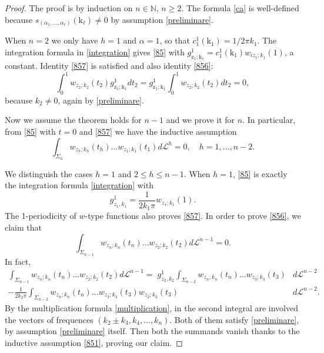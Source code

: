 \documentclass[12pt, reqno]{amsart}
\theoremstyle{plain}
\theoremstyle{definition}
\theoremstyle{remark}
\numberwithin{equation}{section}
\newcommand{\N}{\mathbb{N}}
\renewcommand{\L}{\mathcal{L}}
\newcommand{\0}{\theta}
\renewcommand{\a}{\alpha}
\renewcommand{\k}{\kappa}
\newcommand{\z}{\zeta}
\newcommand{\1}{{-1}}
\renewcommand{\l}{\ell}
\renewcommand{\=}{\coloneqq}
\renewcommand{\.}{\dots}
\newcommand{\be}{\begin{equation}}
\newcommand{\ee}{\end{equation}}
\renewcommand{\z}{\mathrm z}
\renewcommand{\k}{\mathrm k}
\begin{document}
 
 
\begin{proof}
 The proof is by induction on $n\in\N$, $n\geq 2$. 
 The formula {\color{black} \eqref{ca}} is well-defined because $s_{(\a_1,\.,\a_\l)}(\k_\l)\neq0$
 by assumption \eqref{preliminare}.  
 
 
 
 
 
 When $n=2$ we only have  $h=1$ and  $\a=1$, so that $c_1^1(\k_1)= 1/2\pi k_1$.
 The integration formula in  \eqref{integration} gives \eqref{85} with     $g_{\z_1;\k_1}^1 = c_1^1(\k_1)w_{iz_1;k_1}(1)$, a constant.
 Identity \eqref{857} is satisfied and also identity  \eqref{856}:
 \[
 \int_{0}^1  w_{z_2;k_2}(t_2) g_{\z_1;\k_1}^1 dt_2 = g_{\z_1;\k_1}^1
 \int_{0}^1  w_{z_2;k_2}(t_2)  dt_2 =0,
 \]
 because $k_2\neq 0$, again by   \eqref{preliminare}.
 
 
 
 
 Now we assume   the theorem holds for $n-1$ and we prove it for $n$.
In particular, from \eqref{85} with $t=0$ and \eqref{857} we have the   inductive assumption
\be\label{851}
 \int_{\Sigma_{h}  }w_{z_{h} ;k_{h} }(t_{h} ) \.w_{z_1;k_1}(t_1) d\L^h=0, \quad h=1,\dots,n-2 .
 \ee
 
 We distinguish the cases $h=1$ and $2\leq h \leq n-1$. When $h=1$, \eqref{85} is exactly the integration formula 
 \eqref{integration} with 
 \[
  g^1_{z_1,k_1}=\frac{1}{2k_1\pi}w_{z_1;k_1}(1).
 \]
 The 1-periodicity of $w$-type functions also proves \eqref{857}. In order to prove \eqref{856}, we claim that
 \[
  \int_{\Sigma_{n-1}}w_{z_n;k_n}(t_n) \.w_{z_2;k_2}(t_2)  d\L^{n-1}=0.
 \]
 In fact,
 \begin{align*}
  \int_{\Sigma_{n-1}}w_{z_n;k_n}(t_n) \.w_{z_2;k_2}(t_2)  d\L^{n-1}= \;g^1_{z_2,k_2}\int_{\Sigma_{n-2}}w_{z_n;k_n}(t_n) \.w_{z_3;k_3}(t_3)&d\L^{n-2} \\
  - \frac{1}{2k_2\pi}\int_{\Sigma_{n-2}}w_{z_n;k_n}(t_n) \.w_{z_3;k_3}(t_3)w_{z_2;k_2}(t_3)&d\L^{n-2}.
 \end{align*}
 By the multiplication formula \eqref{multiplication}, in the second integral are involved the vectors of frequences $(k_2\pm k_3,k_4,\.,k_n)$. Both of them satisfy  \eqref{preliminare}, by assumption \eqref{preliminare} itself.
 Then both the summands vanish thanks to the inductive assumption \eqref{851}, proving our claim. 

 
 
 
 

\end{proof}
\end{document}
